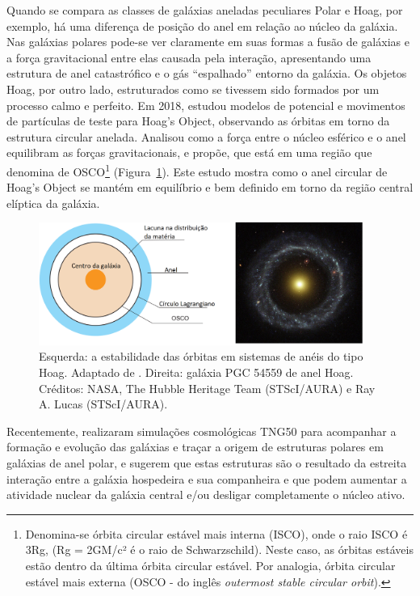 Quando se compara as classes de galáxias aneladas peculiares Polar e Hoag, por exemplo, há uma diferença de posição do anel em relação ao núcleo da galáxia. Nas galáxias polares pode-se ver claramente em suas formas a fusão de galáxias e a força gravitacional entre elas causada pela interação, apresentando uma estrutura de anel catastrófico e o gás ``espalhado'' entorno da galáxia. Os objetos Hoag, por outro lado, estruturados como se tivessem sido formados por um processo calmo e perfeito. Em 2018,  estudou modelos de potencial e movimentos de partículas de teste para Hoag's Object, observando as órbitas em torno da estrutura circular anelada. Analisou como a força entre o núcleo esférico e o anel equilibram as forças gravitacionais, e propõe, que está em uma região que denomina de OSCO\footnote{Denomina-se órbita circular estável mais interna (ISCO), onde o raio ISCO é 3Rg, (Rg = 2GM/c² é o raio de Schwarzschild). Neste caso, as órbitas estáveis estão dentro da última órbita circular estável. Por analogia, órbita circular estável mais externa (OSCO - do inglês \emph{outermost stable circular orbit}).} (Figura~\ref{fig:osco}). Este estudo mostra como o anel circular de Hoag's Object se mantém em equilíbrio e bem definido em torno da região central elíptica da galáxia.

\begin{figure}[h]
  \centering 
  \includegraphics[width=0.95\textwidth]{Imagens/innerring.PNG} 
  \caption[Estabilidade das órbitas em sistemas de anéis do tipo Hoag.]{Esquerda: a estabilidade das órbitas em sistemas de anéis do tipo Hoag. Adaptado de . Direita: galáxia PGC 54559 de anel Hoag. Créditos: NASA, The Hubble Heritage Team (STScI/AURA) e Ray A. Lucas (STScI/AURA).}
  \label{fig:osco} 
\end{figure}

Recentemente,  realizaram simulações cosmológicas TNG50 para acompanhar a formação e evolução das galáxias e traçar a origem de estruturas polares em galáxias de anel polar, e sugerem que estas estruturas são o resultado da estreita interação entre a galáxia hospedeira e sua companheira e que podem aumentar a atividade nuclear da galáxia central e/ou desligar completamente o núcleo ativo.

